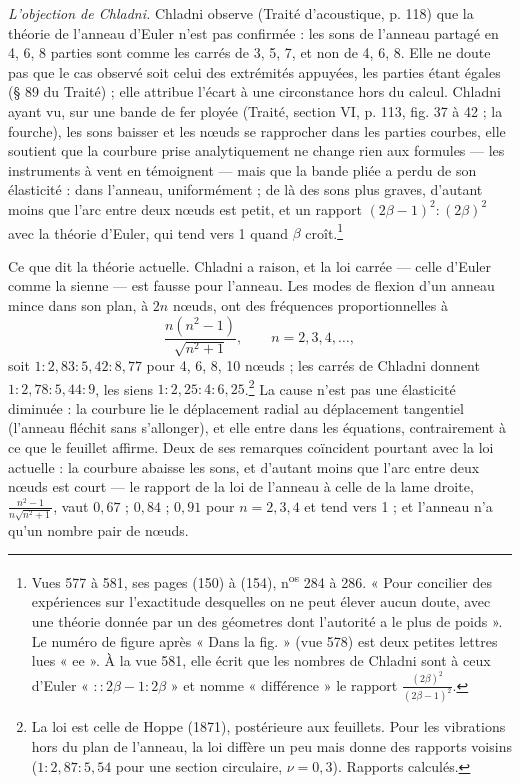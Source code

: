 \documentclass[11pt,a4paper]{article}
\begin{document}
\emph{L'objection de Chladni.} Chladni observe (Traité d'acoustique, p. 118)
que la théorie de l'anneau d'Euler n'est pas confirmée : les sons de l'anneau
partagé en 4, 6, 8 parties sont comme les carrés de 3, 5, 7, et non de 4, 6, 8.
Elle ne doute pas que le cas observé soit celui des extrémités appuyées, les
parties étant égales (§ 89 du Traité) ; elle attribue l'écart à une circonstance
hors du calcul. Chladni ayant vu, sur une bande de fer ployée (Traité, section
VI, p. 113, fig. 37 à 42 ; la fourche), les sons baisser et les nœuds se
rapprocher dans les parties courbes, elle soutient que la courbure prise
analytiquement ne change rien aux formules — les instruments à vent en
témoignent — mais que la bande pliée a perdu de son élasticité : dans l'anneau,
uniformément ; de là des sons plus graves, d'autant moins que l'arc entre deux
nœuds est petit, et un rapport $(2\beta-1)^2 : (2\beta)^2$ avec la théorie
d'Euler, qui tend vers 1 quand $\beta$ croît.\footnote{Vues 577 à 581, ses
pages (150) à (154), n\textsuperscript{os} 284 à 286. « Pour concilier des
expériences sur l'exactitude desquelles on ne peut élever aucun doute, avec une
théorie donnée par un des géometres dont l'autorité a le plus de poids ». Le
numéro de figure après « Dans la fig. » (vue 578) est deux petites lettres lues
« ee ». À la vue 581, elle écrit que les nombres de Chladni sont à ceux d'Euler
« $::2\beta-1:2\beta$ » et nomme « différence » le rapport
$\frac{(2\beta)^2}{(2\beta-1)^2}$.}

Ce que dit la théorie actuelle. Chladni a raison, et la loi carrée — celle
d'Euler comme la sienne — est fausse pour l'anneau. Les modes de flexion d'un
anneau mince dans son plan, à $2n$ nœuds, ont des fréquences proportionnelles à
\[
\frac{n(n^2-1)}{\sqrt{n^2+1}}, \qquad n = 2, 3, 4, \dots,
\]
soit $1 : 2{,}83 : 5{,}42 : 8{,}77$ pour 4, 6, 8, 10 nœuds ; les carrés de
Chladni donnent $1 : 2{,}78 : 5{,}44 : 9$, les siens
$1 : 2{,}25 : 4 : 6{,}25$.\footnote{La loi est celle de Hoppe (1871), postérieure
aux feuillets. Pour les vibrations hors du plan de l'anneau, la loi diffère
un peu mais donne des rapports voisins ($1 : 2{,}87 : 5{,}54$ pour une section
circulaire, $\nu = 0{,}3$). Rapports calculés.} La cause n'est pas une
élasticité diminuée : la courbure lie le déplacement radial au déplacement
tangentiel (l'anneau fléchit sans s'allonger), et elle entre dans les équations,
contrairement à ce que le feuillet affirme. Deux de ses remarques coïncident
pourtant avec la loi actuelle : la courbure abaisse les sons, et d'autant moins
que l'arc entre deux nœuds est court — le rapport de la loi de l'anneau à celle
de la lame droite, $\frac{n^2-1}{n\sqrt{n^2+1}}$, vaut $0{,}67$ ; $0{,}84$ ;
$0{,}91$ pour $n = 2, 3, 4$ et tend vers 1 ; et l'anneau n'a qu'un nombre pair de
nœuds.
\end{document}
